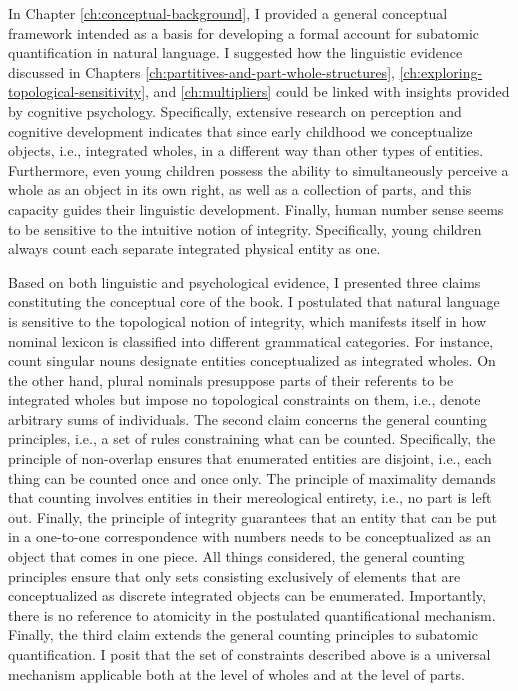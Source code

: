 In Chapter \ref{ch:conceptual-background}, I provided a general conceptual framework intended as a basis for developing a formal account for subatomic quantification in natural language. I suggested how the linguistic evidence discussed in Chapters \ref{ch:partitives-and-part-whole-structures}, \ref{ch:exploring-topological-sensitivity}, and \ref{ch:multipliers} could be linked with insights provided by cognitive psychology. Specifically, extensive research on perception and cognitive development indicates that since early childhood we conceptualize objects, i.e., integrated wholes, in a different way than other types of entities. Furthermore, even young children possess the ability to simultaneously perceive a whole as an object in its own right, as well as a collection of parts, and this capacity guides their linguistic development. Finally, human number sense seems to be sensitive to the intuitive notion of integrity. Specifically, young children always count each separate integrated physical entity as one. 

Based on both linguistic and psychological evidence, I presented three claims constituting the conceptual core of the book. I postulated that natural language is sensitive to the topological notion of integrity, which manifests itself in how nominal lexicon is classified into different grammatical categories. For instance, count singular nouns designate entities conceptualized as integrated wholes. On the other hand, plural nominals presuppose parts of their referents to be integrated wholes but impose no topological constraints on them, i.e., denote arbitrary sums of individuals. The second claim concerns the general counting principles, i.e., a set of rules constraining what can be counted. Specifically, the principle of non-overlap ensures that enumerated entities are disjoint, i.e., each thing can be counted once and once only. The principle of maximality demands that counting involves entities in their mereological entirety, i.e., no part is left out. Finally, the principle of integrity guarantees that an entity that can be put in a one-to-one correspondence with numbers needs to be conceptualized as an object that comes in one piece. All things considered, the general counting principles ensure that only sets consisting exclusively of elements that are conceptualized as discrete integrated objects can be enumerated. Importantly, there is no reference to atomicity in the postulated quantificational mechanism. Finally, the third claim extends the general counting principles to subatomic quantification. I posit that the set of constraints described above is a universal mechanism applicable both at the level of wholes and at the level of parts.

